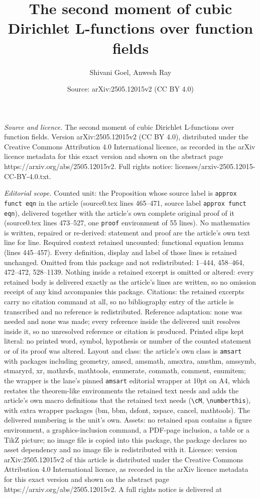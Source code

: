 \documentclass[10pt,a4paper]{amsart}
\title[The second moment of cubic Dirichlet L-functions over functi]{The second moment of cubic Dirichlet L-functions over function fields}
\author{Shivani Goel, Anwesh Ray}
\date{Source: arXiv:2505.12015v2 (CC BY 4.0)}
\begin{document}
\maketitle

\noindent\emph{Source and licence.} The second moment of cubic Dirichlet L-functions over function fields. Version arXiv:2505.12015v2 (CC BY 4.0), distributed under the Creative Commons Attribution 4.0 International licence, as recorded in the arXiv licence metadata for this exact version and shown on the abstract page https://arxiv.org/abs/2505.12015v2. Full rights notice: licenses/arxiv-2505.12015-CC-BY-4.0.txt.\par\smallskip

\noindent\textit{Editorial scope.} Counted unit: the Proposition whose source label is \texttt{approx funct eqn} in the article (source0.tex lines 465--471, source label \texttt{approx funct eqn}), delivered together with the article's own complete original proof of it (source0.tex lines 473--527, one \texttt{proof} environment of 55 lines). No mathematics is written, repaired or re-derived: statement and proof are the article's own text line for line. Required context retained uncounted: functional equation lemma (lines 445--457). Every definition, display and label of those lines is retained unchanged. Omitted from this package and not redistributed: 1--444, 458--464, 472--472, 528--1139. Nothing inside a retained excerpt is omitted or altered: every retained body is delivered exactly as the article's lines are written, so no omission receipt of any kind accompanies this package. Citations: the retained excerpts carry no citation command at all, so no bibliography entry of the article is transcribed and no reference is redistributed. Reference adaptation: none was needed and none was made; every reference inside the delivered unit resolves inside it, so no unresolved reference or citation is produced. Printed slips kept literal: no printed word, symbol, hypothesis or number of the counted statement or of its proof was altered. Layout and class: the article's own class is \texttt{amsart} with packages including geometry, amscd, amsmath, amsxtra, amsthm, amssymb, stmaryrd, xr, mathrsfs, mathtools, enumerate, commath, comment, enumitem; the wrapper is the lane's pinned \texttt{amsart} editorial wrapper at 10pt on A4, which restates the theorem-like environments the retained text needs and adds the article's own macro definitions that the retained text needs (\texttt{\textbackslash cM}, \texttt{\textbackslash numberthis}), with extra wrapper packages (bm, bbm, dsfont, xspace, cancel, mathtools). The delivered numbering is the unit's own. Assets: no retained span contains a figure environment, a graphics-inclusion command, a PDF-page inclusion, a table or a TikZ picture; no image file is copied into this package, the package declares no asset dependency and no image file is redistributed with it. Licence: version arXiv:2505.12015v2 of this article is distributed under the Creative Commons Attribution 4.0 International licence, as recorded in the arXiv licence metadata for this exact version and shown on the abstract page https://arxiv.org/abs/2505.12015v2. A full rights notice is delivered at 
\end{document}
